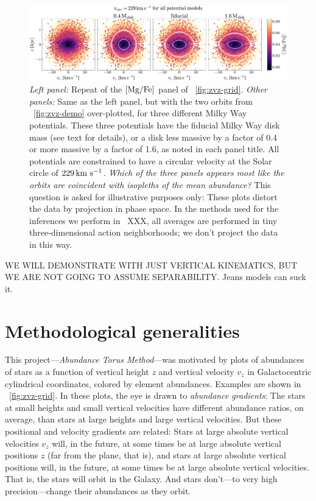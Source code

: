 \documentclass[modern]{aastex63}
\newcommand{\methodname}{\textsl{Abundance Torus Method}}
\begin{document}
\begin{figure}[!tp]
  \begin{center}
  \includegraphics[width=\textwidth]{zvz-mean-MG_FE}
  \end{center}
  \caption{%
    \textsl{Left panel:} Repeat of the ${[\mathrm{Mg}/\mathrm{Fe}]}$ panel of \figurename~\ref{fig:zvz-grid}.
    \textsl{Other panels:} Same as the left panel, but with the two orbits
    from \figurename~\ref{fig:zvz-demo}
    over-plotted, for three different Milky Way potentials.
    These three potentials have the fiducial Milky Way disk mass (see text
    for details), or a disk less massive by a factor of 0.4 or more
    massive by a factor of 1.6, as noted in each panel title.
    All potentials are constrained to have a circular velocity at the
    Solar circle of $229\,\mathrm{km}~\mathrm{s}^{-1}$.
    \emph{Which of the three panels appears most like the orbits are
    coincident with isopleths of the mean abundance?}
    This question is asked for illustrative purposes only: These
    plots distort the data by projection in phase space.
    In the methods used for the inferences we perform in
    \sectionname~XXX, all averages are performed in tiny
    three-dimensional action neighborhoods; we don't project the data in this way.
  \label{fig:zvz-mgfe}
  }
\end{figure}

WE WILL DEMONSTRATE WITH JUST VERTICAL KINEMATICS, BUT WE ARE NOT
GOING TO ASSUME SEPARABILITY.  Jeans models can suck it.

\section{Methodological generalities}

This project---\methodname---was motivated by plots of abundances of stars as a
function of vertical height $z$ and vertical velocity $v_z$ in
Galactocentric cylindrical coordinates, colored by element abundances.
Examples are shown in \figurename~\ref{fig:zvz-grid}.
In these plots,
the eye is drawn to \emph{abundance gradients}: The stars at small
heights and small vertical velocities have different abundance ratios,
on average, than stars at large heights and large vertical velocities.
But these positional and velocity gradients are related:
Stars at large absolute vertical velocities $v_z$ will, in the future, at some
times be at large absolute vertical positions $z$ (far from the plane, that is),
and stars at large absolute vertical positions will, in the future,
at some times be at large absolute vertical velocities.
That is, the stars will orbit in the Galaxy.
And stars don't---to very high precision---change their abundances as
they orbit.
\end{document}
